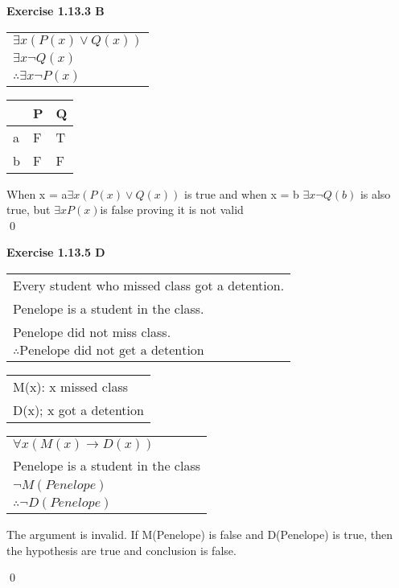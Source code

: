 \documentclass[11pt]{article}
\begin{document}
\noindent \textbf{Exercise 1.13.3 B}\\

\begin{center}
  \begin{tabular}{l}
  $\exists x (P(x) \vee Q(x))$\\
  $\exists x \neg Q(x)$\\
     \hline
  $ \therefore \exists x \neg P(x) $
 

  \end{tabular}
\end{center}

\begin{center}
\begin{tabular}{|l|l|l|}
\hline
 & P& Q \\ \hline
a & F & T \\ \hline
b & F & F \\ \hline
\end{tabular}
\end{center}

\noindent When x = a$\exists x (P(x) \vee Q(x))$ is true and when x = b $\exists x \neg Q(b)$ is also true, but $\exists xP(x)$is false proving it is not valid\\
\qed 
\newpage 

\noindent \textbf{Exercise 1.13.5 D}
\begin{center}
  \begin{tabular}{l}
  Every student who missed class got a detention.\\
  Penelope is a student in the class.\\
  Penelope did not miss class.\\
    \hline
  $ \therefore \text{Penelope did not get a detention}$
  \end{tabular}
  
  \begin{center}
\begin{tabular}{l}

M(x): x missed class\\
D(x); x got a detention\\
\end{tabular}
\end{center}

\begin{center}
\begin{tabular}{l}
$\forall x (M(x) \rightarrow D(x))$\\
Penelope is a student in the class\\
$\neg M(Penelope)$\\
\hline
$\therefore \neg D(Penelope)$\\
\end{tabular}
\end{center}

\noindent The argument is invalid. If M(Penelope) is false and D(Penelope) is true, then the hypothesis are true and conclusion is false.\\
\end{center}
\qed
\end{document}
